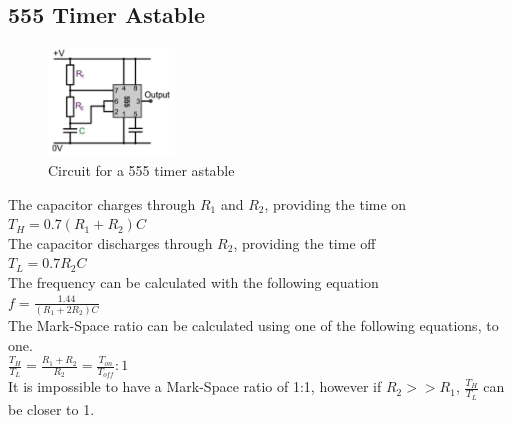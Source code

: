 \documentclass[a4paper,11pt, twocolumn]{article}
\begin{document}
\subsection{555 Timer Astable}
\begin{figure}[H]
    \centering
    \includegraphics[width=0.3\textwidth]{images/asta555.jpg}
    \caption{Circuit for a 555 timer astable}
    \label{fig:asta555}
\end{figure}
\noindent The capacitor charges through $R_1$ and $R_2$, providing the time on\\
$\displaystyle T_H = 0.7 (R_1 + R_2) C$\\
The capacitor discharges through $R_2$, providing the time off\\
$T_L = 0.7 R_2 C$\\
The frequency can be calculated with the following equation\\
$\displaystyle f= \frac{1.44}{(R_1 + 2R_2)C}$\\
The Mark-Space ratio can be calculated using one of the following equations, to one.\\
$\displaystyle \frac{T_H}{T_L} = \frac{R_1 + R_2}{R_2} = \frac{T_{on}}{T_{off}} : 1$\\
It is impossible to have a Mark-Space ratio of 1:1, however if $R_2 >> R_1$, $\displaystyle \frac{T_H}{T_L}$ can be closer to 1.
\end{document}
